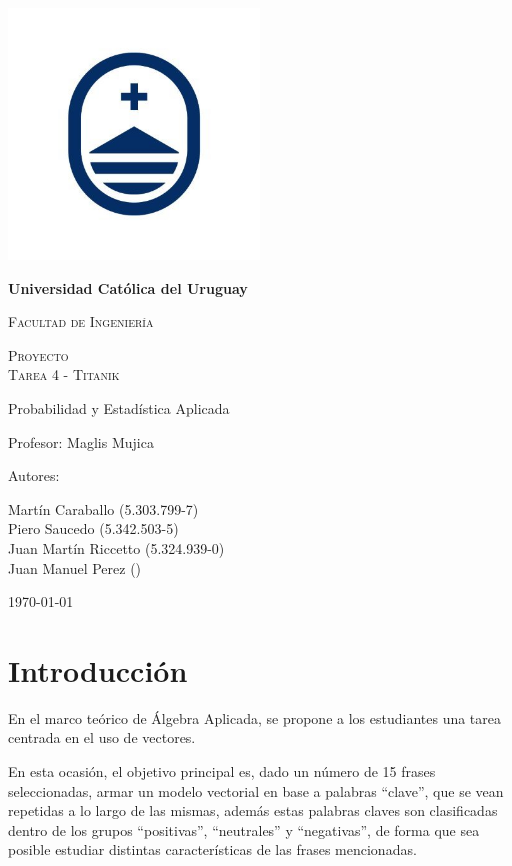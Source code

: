\documentclass{article}
\begin{document}
\begin{titlepage}
    \centering
    {\includegraphics[width=0.5\textwidth]{logo2}\par}
    {\bfseries\LARGE Universidad Católica del Uruguay \par}
    \vspace{0.3cm}
    {\scshape\Large Facultad de Ingeniería \par}
    \vspace{0.3cm}
    {\scshape\Huge Proyecto \\Tarea 4 - Titanik \par}
    \vspace{1cm}
    {\Large Probabilidad y Estadística Aplicada \par}
    {\Large Profesor: Maglis Mujica \par}
    \vfill
    {\Large Autores: \par}
    {\Large Martín Caraballo (5.303.799-7)\\Piero Saucedo (5.342.503-5)\\Juan Martín Riccetto (5.324.939-0)\\Juan Manuel Perez () \par}
    \vfill
    {\Large \today \par}
\end{titlepage}

\section{Introducción}\label{sec:introduccion}
    En el marco teórico de Álgebra Aplicada, se propone a los estudiantes una tarea centrada en el uso de vectores.

    En esta ocasión, el objetivo principal es, dado un número de 15 frases seleccionadas, armar un modelo
    vectorial en base a palabras “clave”, que se vean repetidas a lo largo de las mismas, además estas palabras
    claves son clasificadas dentro de los grupos “positivas”, “neutrales” y “negativas”, de forma que sea posible
    estudiar distintas características de las frases mencionadas.
\end{document}
